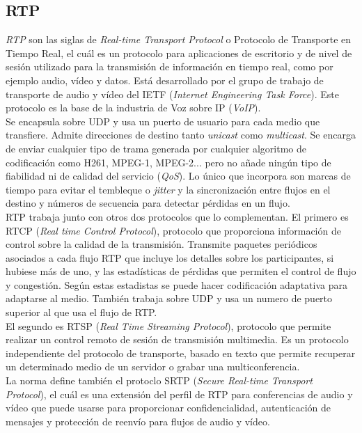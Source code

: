 \subsection{RTP}

\emph{RTP} son las siglas de \emph{Real-time Transport Protocol} o Protocolo de Transporte en Tiempo Real, el cuál es un protocolo para aplicaciones de escritorio y de nivel de sesión utilizado para la transmisión de información en tiempo real, como por ejemplo audio, vídeo y datos. Está desarrollado por el grupo de trabajo de transporte de audio y vídeo del IETF (\emph{Internet Engineering Task Force}). Este protocolo es la base de la industria de Voz sobre IP (\emph{VoIP}).\\

Se encapsula sobre UDP y usa un puerto de usuario para cada medio que transfiere. Admite direcciones de destino tanto \emph{unicast} como \emph{multicast}. Se encarga de enviar cualquier tipo de trama generada por cualquier algoritmo de codificación como H261, MPEG-1, MPEG-2... pero no añade ningún tipo de fiabilidad ni de calidad del servicio (\emph{QoS}). Lo único que incorpora son marcas de tiempo para evitar el tembleque o \emph{jitter} y la sincronización entre flujos en el destino y números de secuencia para detectar pérdidas en un flujo.\\

RTP trabaja junto con otros dos protocolos que lo complementan. El primero es RTCP (\emph{Real time Control Protocol}), protocolo que proporciona información de control sobre la calidad de la transmisión. Transmite paquetes periódicos asociados a cada flujo RTP que incluye los detalles sobre los participantes, si hubiese más de uno, y las estadísticas de pérdidas que permiten el control de flujo y congestión. Según estas estadistas se puede hacer codificación adaptativa para adaptarse al medio. También trabaja sobre UDP y usa un numero de puerto superior al que usa el flujo de RTP.\\

El segundo es RTSP (\emph{Real Time Streaming Protocol}), protocolo que permite realizar un control remoto de sesión de transmisión multimedia. Es un protocolo independiente del protocolo de transporte, basado en texto que permite recuperar un determinado medio de un servidor o grabar una multiconferencia.\\

La norma define también el protoclo SRTP (\emph{Secure Real-time Transport Protocol}), el cuál es una extensión del perfil de RTP para conferencias de audio y vídeo que puede usarse para proporcionar confidencialidad, autenticación de mensajes y protección de reenvío para flujos de audio y vídeo.\\


